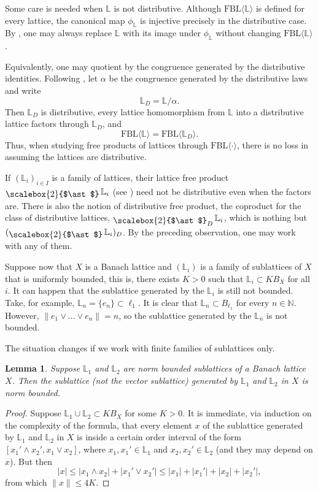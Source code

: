 \documentclass[12pt]{amsart}
\newcommand{\FBL}{\mathrm{FBL}}
\DeclareMathOperator*{\bigfree}{\raisebox{-0.6ex}{\scalebox{2}{$\ast$}}}
\theoremstyle{plain}
\newtheorem{lemma}[theorem]{Lemma}
\theoremstyle{definition}
\begin{document}
Some care is needed when $\mathbb L$ is not distributive. Although $\FBL\langle \mathbb L\rangle$ is defined for every lattice, the canonical map $\phi_{\mathbb L}$ is injective precisely in the distributive case. By \cite[Proposition~3.2]{freebanlatlat}, one may always replace $\mathbb L$ with its image under $\phi_{\mathbb L}$ without changing $\FBL\langle \mathbb L\rangle$.

Equivalently, one may quotient by the congruence generated by the distributive identities. Following \cite{Gratzer}, let $\alpha$ be the congruence generated by the distributive laws and write
\[
\mathbb L_D=\mathbb L/\alpha.
\]
Then $\mathbb L_D$ is distributive, every lattice homomorphism from $\mathbb L$ into a distributive lattice factors through $\mathbb L_D$, and
\[
\FBL\langle \mathbb L\rangle=\FBL\langle \mathbb L_D\rangle.
\]
Thus, when studying free products of lattices through $\FBL\langle \cdot\rangle$, there is no loss in assuming the lattices are distributive.

If $(\mathbb L_i)_{i\in I}$ is a family of lattices, their lattice free product $\bigfree \mathbb L_i$ (see \cite[Chapter VII ]{Gratzer}) need not be distributive even when the factors are. There is also the notion of distributive free product, the coproduct for the class of distributive lattices, $\bigfree_D\mathbb L_i$, which is nothing but $(\bigfree \mathbb L_i)_D$. By the preceding observation, one may work with any of them.

Suppose now that $X$ is a Banach lattice and $(\mathbb L_i)$ is a family of sublattices of $X$ that is uniformly bounded, this is, there exists $K>0$ such that $\mathbb L_i\subset KB_X$ for all $i$. It can happen that the sublattice generated by the $\mathbb L_i$ is still not bounded. Take, for example, $\mathbb L_n=\{e_n\}\subset \ell_1$. It is clear that $\mathbb L_n\subset B_{\ell_1}$ for every $n\in\mathbb{N}$. However, $\|e_1\vee\ldots\vee e_n\|=n$, so the sublattice generated by the $\mathbb L_n$ is not bounded.
 
 The situation changes if we work with finite families of sublattices only. 
 
 \begin{lemma}\label{lem:bounded-sublattice} 
 Suppose $\mathbb L_1$ and $\mathbb L_2$ are norm bounded sublattices of a Banach lattice $X$. Then the sublattice (not the vector sublattice) generated by $\mathbb L_1$ and $\mathbb L_2$ in $X$ is norm bounded.
 \end{lemma} 
 
 \begin{proof} 
 Suppose $\mathbb L_1\cup \mathbb L_2\subset KB_X$ for some $K>0$. It is immediate, via induction on the complexity of the formula, that every element $x$ of the sublattice generated by $\mathbb L_1$ and $\mathbb L_2$ in $X$ is inside a certain order interval of the form $[x_1'\wedge x_2',x_1\vee x_2]$, where $x_1,x_1'\in \mathbb L_1$ and $x_2,x_2'\in \mathbb L_2$ (and they may depend on $x$). But then $$|x|\leq |x_1\wedge x_2|+|x_1'\vee x_2'|\leq |x_1|+|x_1'|+|x_2|+|x_2'|,$$
 from which $\|x\|\leq 4K$.
 \end{proof}
\end{document}
